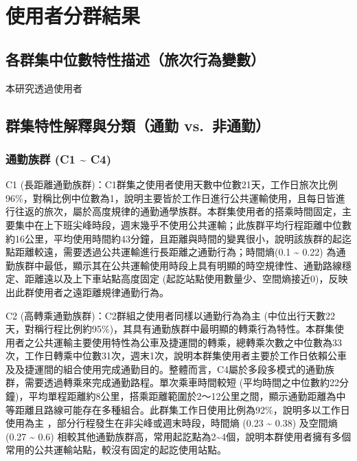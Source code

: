 \section{使用者分群結果}\label{ux4f7fux7528ux8005ux5206ux7fa4ux7d50ux679c}

\subsection{各群集中位數特性描述（旅次行為變數）}\label{ux5404ux7fa4ux96c6ux4e2dux4f4dux6578ux7279ux6027ux63cfux8ff0ux65c5ux6b21ux884cux70baux8b8aux6578}

本研究透過使用者

\subsection{群集特性解釋與分類（通勤
vs.~非通勤）}\label{ux7fa4ux96c6ux7279ux6027ux89e3ux91cbux8207ux5206ux985eux901aux52e4-vs.-ux975eux901aux52e4}

\subsubsection{通勤族群 (C1 \textasciitilde{}
C4)}\label{ux901aux52e4ux65cfux7fa4-c1-c4}

C1
(長距離通勤族群)：C1群集之使用者使用天數中位數21天，工作日旅次比例96\%，對稱比例中位數為1，說明主要皆於工作日進行公共運輸使用，且每日皆進行往返的旅次，屬於高度規律的通勤通學族群。本群集使用者的搭乘時間固定，主要集中在上下班尖峰時段，週末幾乎不使用公共運輸；此族群平均行程距離中位數約16公里，平均使用時間約43分鐘，且距離與時間的變異很小，說明該族群的起迄點距離較遠，需要透過公共運輸進行長距離之通勤行為；時間熵(0.1
\textasciitilde{} 0.22)
為通勤族群中最低，顯示其在公共運輸使用時段上具有明顯的時空規律性、通勤路線穩定、距離遠以及上下車站點高度固定
(起訖站點使用數量少、空間熵接近0)，反映出此群使用者之遠距離規律通勤行為。

C2 (高轉乘通勤族群)：C2群組之使用者同樣以通勤行為為主
(中位出行天數22天，對稱行程比例約95\%)，其具有通勤族群中最明顯的轉乘行為特性。本群集使用者之公共運輸主要使用特性為公車及捷運間的轉乘，總轉乘次數之中位數為33次，工作日轉乘中位數31次，週末1次，說明本群集使用者主要於工作日依賴公車及及捷運間的組合使用完成通勤目的。整體而言，C4屬於多段多模式的通勤族群，需要透過轉乘來完成通勤路程。單次乘車時間較短
(平均時間之中位數約22分鐘)，平均單程距離約8公里，搭乘距離範圍於2～12公里之間，顯示通勤距離為中等距離且路線可能存在多種組合。此群集工作日使用比例為92\%，說明多以工作日使用為主
，部分行程發生在非尖峰或週末時段，時間熵 (0.23 \textasciitilde{} 0.38)
及空間熵 (0.27 \textasciitilde{} 0.6)
相較其他通勤族群高，常用起訖點為2\textasciitilde4個，說明本群使用者擁有多個常用的公共運輸站點，較沒有固定的起訖使用站點。

